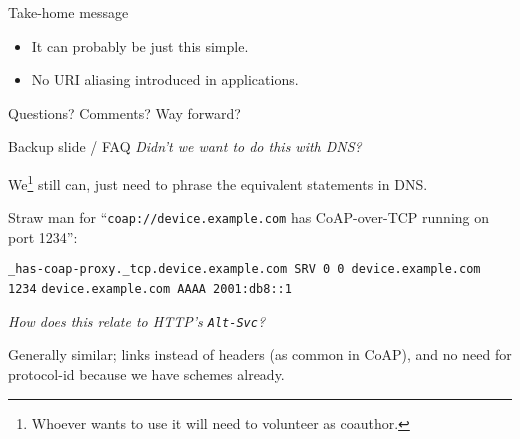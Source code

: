 \documentclass[aspectratio=169]{beamer}
\begin{document}
\begin{frame}{Take-home message}\Large 
	\begin{itemize}
		\item It can probably be just this simple.
		\item No URI aliasing introduced in applications.
	\end{itemize}

	\vspace{2cm}

	Questions? Comments? Way forward?
\end{frame}

\begin{frame}{Backup slide / FAQ}
	\setlength{\parskip}{0.5em}
	\textit{Didn't we want to do this with DNS?}

	We\footnote{Whoever wants to use it will need to volunteer as coauthor.} still can, just need to phrase the equivalent statements in DNS.

	Straw man for ``\texttt{coap://device.example.com} has CoAP-over-TCP running on port 1234'':

	\texttt{\_has-coap-proxy.\_tcp.device.example.com SRV 0 0 device.example.com 1234}
	\texttt{device.example.com AAAA 2001:db8::1}

	\bigskip

	\textit{How does this relate to HTTP's \texttt{Alt-Svc}?}

	Generally similar; links instead of headers (as common in CoAP), and no need for protocol-id because we have schemes already.
\end{frame}
\end{document}
